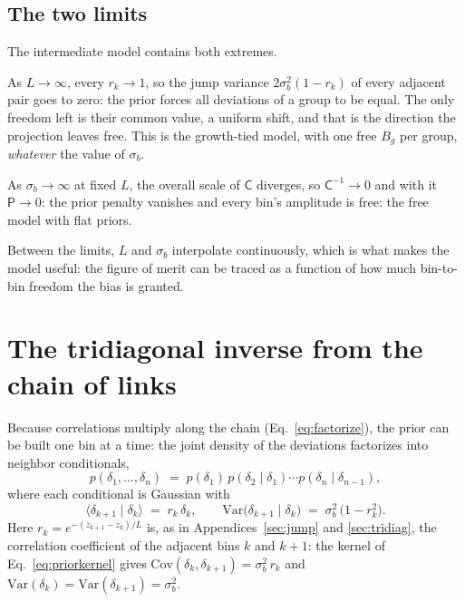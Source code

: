 \documentclass[11pt]{article}
\newcommand{\Cov}{\mathsf{C}}
\newcommand{\Prec}{\mathsf{P}}
\begin{document}
\subsection{The two limits}
\label{sec:limits}

The intermediate model contains both extremes.

As $L \to \infty$, every $r_k \to 1$, so the jump variance
$2\sigma_b^2(1 - r_k)$ of every adjacent pair goes to zero: the prior
forces all deviations of a group to be equal.  The only freedom left is
their common value, a uniform shift, and that is the direction the
projection leaves free.  This is the growth-tied model, with one free $B_g$
per group, \emph{whatever} the value of $\sigma_b$.

As $\sigma_b \to \infty$ at fixed $L$, the overall scale of $\Cov$
diverges, so $\Cov^{-1} \to 0$ and with it $\Prec \to 0$: the prior
penalty vanishes and every bin's amplitude is free: the free
model with flat priors.

Between the limits, $L$ and $\sigma_b$ interpolate continuously, which
is what makes the model useful: the figure of merit can be traced as a
function of how much bin-to-bin freedom the bias is granted.

\section{The tridiagonal inverse from the chain of links}
\label{app:chain}

Because correlations multiply along the chain
(Eq.~\eqref{eq:factorize}), the prior can be built one bin at a time:
the joint density of the deviations factorizes into neighbor
conditionals,
\begin{equation}
  p(\delta_1, \dots, \delta_n)
  \;=\;
  p(\delta_1)\, p(\delta_2 \mid \delta_1) \cdots
  p(\delta_n \mid \delta_{n-1}),
  \label{eq:chainfactor}
\end{equation}
where each conditional is Gaussian with
\begin{equation}
  \bigl\langle \delta_{k+1} \mid \delta_k \bigr\rangle
  \;=\; r_k\,\delta_k,
  \qquad
  \mathrm{Var}\bigl(\delta_{k+1} \mid \delta_k\bigr)
  \;=\; \sigma_b^2\,\bigl(1 - r_k^2\bigr).
  \label{eq:conditional}
\end{equation}
Here $r_k = e^{-(z_{k+1} - z_k)/L}$ is, as in
Appendices~\ref{sec:jump} and \ref{sec:tridiag}, the correlation
coefficient of the adjacent bins $k$ and $k+1$: the kernel of
Eq.~\eqref{eq:priorkernel} gives
$\mathrm{Cov}(\delta_k, \delta_{k+1}) = \sigma_b^2\, r_k$ and
$\mathrm{Var}(\delta_k) = \mathrm{Var}(\delta_{k+1}) = \sigma_b^2$.
\end{document}
